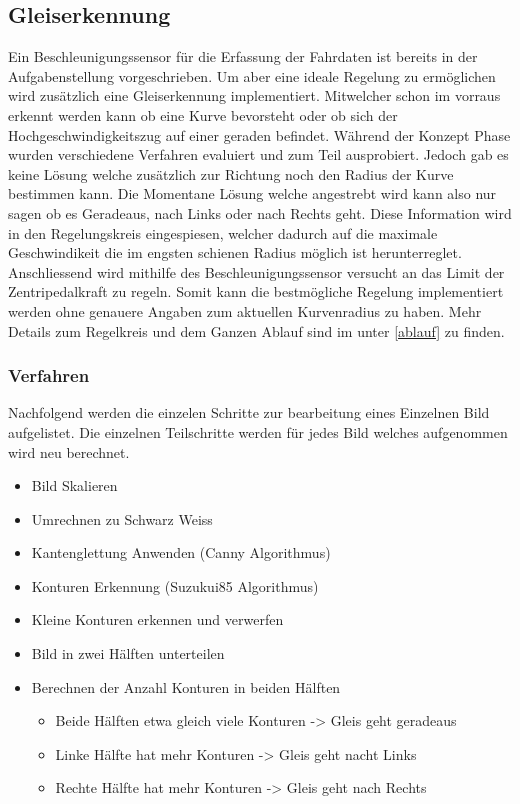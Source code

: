 \documentclass[../../main.tex]{subfiles}
\begin{document}
\subsection{Gleiserkennung}
Ein Beschleunigungssensor für die Erfassung der Fahrdaten ist bereits in der Aufgabenstellung vorgeschrieben.
Um aber eine ideale Regelung zu ermöglichen wird zusätzlich eine Gleiserkennung implementiert. Mitwelcher schon im vorraus
erkennt werden kann ob eine Kurve bevorsteht oder ob sich der Hochgeschwindigkeitszug auf einer geraden befindet.
Während der Konzept Phase wurden verschiedene Verfahren evaluiert und zum Teil ausprobiert. Jedoch gab es keine Lösung welche zusätzlich zur Richtung noch den Radius
der Kurve bestimmen kann. Die Momentane Lösung welche angestrebt wird kann also nur sagen ob es Geradeaus, nach Links oder nach Rechts geht.
Diese Information wird in den Regelungskreis eingespiesen, welcher dadurch auf die maximale Geschwindikeit die im engsten schienen Radius möglich ist
herunterreglet. Anschliessend wird mithilfe des Beschleunigungssensor versucht an das Limit der Zentripedalkraft zu regeln. Somit kann die
bestmögliche Regelung implementiert werden ohne genauere Angaben zum aktuellen Kurvenradius zu haben.
Mehr Details zum Regelkreis und dem Ganzen Ablauf sind im unter \ref{ablauf} zu finden.

\subsubsection{Verfahren}
Nachfolgend werden die einzelen Schritte zur bearbeitung eines Einzelnen Bild aufgelistet.
Die einzelnen Teilschritte werden für jedes Bild welches aufgenommen wird neu berechnet.
\begin{itemize} %
    \item Bild Skalieren
    \item Umrechnen zu Schwarz Weiss
    \item Kantenglettung Anwenden (Canny Algorithmus)
    \item Konturen Erkennung (Suzukui85 Algorithmus)
    \item Kleine Konturen erkennen und verwerfen
    \item Bild in zwei Hälften unterteilen
    \item Berechnen der Anzahl Konturen in beiden Hälften
        \begin{itemize}
            \item Beide Hälften etwa gleich viele Konturen -> Gleis geht geradeaus
            \item Linke Hälfte hat mehr Konturen -> Gleis geht nacht Links
            \item Rechte Hälfte hat mehr Konturen -> Gleis geht nach Rechts
        \end{itemize}
\end{itemize}
\end{document}
